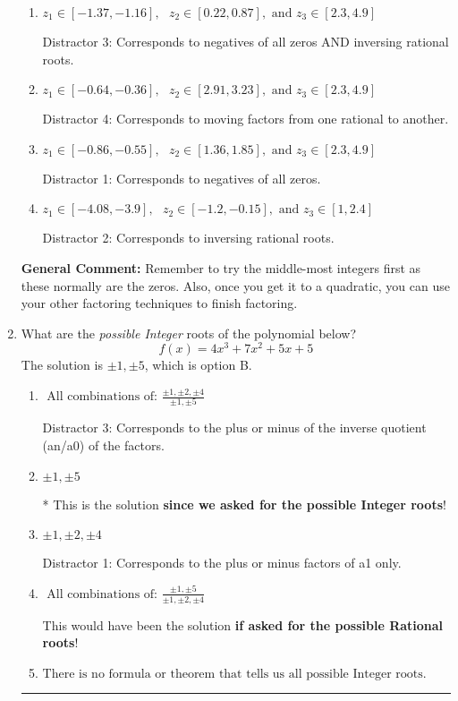 \documentclass{extbook}[14pt]
\newcommand{\litem}[1]{\item #1

\rule{\textwidth}{0.4pt}}
\begin{document}
\begin{enumerate}
{\begin{enumerate}[label=\Alph*.]
* This is the solution!
\item \( z_1 \in [-1.37, -1.16], \text{   }  z_2 \in [0.22, 0.87], \text{   and   } z_3 \in [2.3, 4.9] \)

 Distractor 3: Corresponds to negatives of all zeros AND inversing rational roots.
\item \( z_1 \in [-0.64, -0.36], \text{   }  z_2 \in [2.91, 3.23], \text{   and   } z_3 \in [2.3, 4.9] \)

 Distractor 4: Corresponds to moving factors from one rational to another.
\item \( z_1 \in [-0.86, -0.55], \text{   }  z_2 \in [1.36, 1.85], \text{   and   } z_3 \in [2.3, 4.9] \)

 Distractor 1: Corresponds to negatives of all zeros.
\item \( z_1 \in [-4.08, -3.9], \text{   }  z_2 \in [-1.2, -0.15], \text{   and   } z_3 \in [1, 2.4] \)

 Distractor 2: Corresponds to inversing rational roots.
\end{enumerate}

\textbf{General Comment:} Remember to try the middle-most integers first as these normally are the zeros. Also, once you get it to a quadratic, you can use your other factoring techniques to finish factoring.
}
\litem{
What are the \textit{possible Integer} roots of the polynomial below?
\[ f(x) = 4x^{3} +7 x^{2} +5 x + 5 \]The solution is \( \pm 1,\pm 5 \), which is option B.\begin{enumerate}[label=\Alph*.]
\item \( \text{ All combinations of: }\frac{\pm 1,\pm 2,\pm 4}{\pm 1,\pm 5} \)

 Distractor 3: Corresponds to the plus or minus of the inverse quotient (an/a0) of the factors. 
\item \( \pm 1,\pm 5 \)

* This is the solution \textbf{since we asked for the possible Integer roots}!
\item \( \pm 1,\pm 2,\pm 4 \)

 Distractor 1: Corresponds to the plus or minus factors of a1 only.
\item \( \text{ All combinations of: }\frac{\pm 1,\pm 5}{\pm 1,\pm 2,\pm 4} \)

This would have been the solution \textbf{if asked for the possible Rational roots}!
\item \( \text{There is no formula or theorem that tells us all possible Integer roots.} \)


\end{enumerate}}
\end{enumerate}
\end{document}
